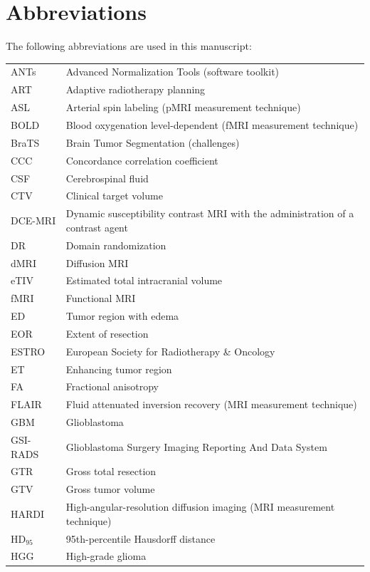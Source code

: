 \documentclass[a4paper,11pt,leqno]{article}
\begin{document}


\section*{Abbreviations}
The following abbreviations are used in this manuscript:\\

\noindent
\begin{tabular}{@{}ll}
ANTs & Advanced Normalization Tools (software toolkit) \\
ART & Adaptive radiotherapy planning \\
ASL & Arterial spin labeling (pMRI measurement technique) \\
BOLD & Blood oxygenation level-dependent (fMRI measurement technique)\\
BraTS & Brain Tumor Segmentation (challenges) \\
CCC & Concordance correlation coefficient \\
CSF & Cerebrospinal fluid \\
CTV & Clinical target volume \\
DCE-MRI & Dynamic susceptibility contrast MRI with the administration of a contrast agent \\
DR & Domain randomization \\
dMRI & Diffusion MRI \\
eTIV & Estimated total intracranial volume \\
fMRI & Functional MRI \\
ED  & Tumor region with edema \\
EOR & Extent of resection \\
ESTRO & European Society for Radiotherapy \& Oncology \\
ET & Enhancing tumor region \\
FA & Fractional anisotropy \\
FLAIR & Fluid attenuated inversion recovery (MRI measurement technique)\\
GBM & Glioblastoma\\
GSI-RADS & Glioblastoma Surgery Imaging Reporting And Data System \\
GTR & Gross total resection \\
GTV & Gross tumor volume \\
HARDI & High-angular-resolution diffusion imaging (MRI measurement technique) \\
HD$_{95}$ & 95th-percentile Hausdorff distance \\
HGG & High-grade glioma \\

\end{tabular}
\end{document}
